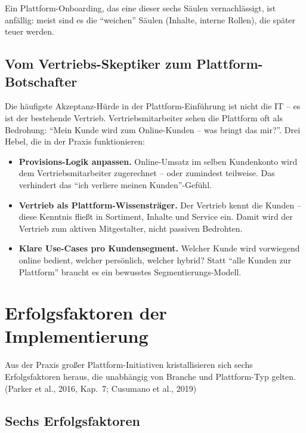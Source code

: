 \documentclass[11pt,a4paper,oneside]{article}
\newcommand{\fachbegriff}[1]{\textbf{#1}}
\newcommand{\quelle}[1]{{\footnotesize\color{lpGray}(#1)}}
\begin{document}
Ein Plattform-Onboarding, das eine dieser sechs Säulen vernachlässigt, ist anfällig: meist sind es die ``weichen'' Säulen (Inhalte, interne Rollen), die später teuer werden.

\subsection{Vom Vertriebs-Skeptiker zum Plattform-Botschafter}

Die häufigste Akzeptanz-Hürde in der Plattform-Einführung ist nicht die IT -- es ist der bestehende Vertrieb. Vertriebsmitarbeiter sehen die Plattform oft als Bedrohung: ``Mein Kunde wird zum Online-Kunden -- was bringt das mir?''. Drei Hebel, die in der Praxis funktionieren:

\begin{itemize}
  \item \fachbegriff{Provisions-Logik anpassen.} Online-Umsatz im selben Kunden­konto wird dem Vertriebsmitarbeiter zugerechnet -- oder zumindest teilweise. Das verhindert das ``ich verliere meinen Kunden''-Gefühl.
  \item \fachbegriff{Vertrieb als Plattform-Wissensträger.} Der Vertrieb kennt die Kunden -- diese Kenntnis fließt in Sortiment, Inhalte und Service ein. Damit wird der Vertrieb zum aktiven Mitgestalter, nicht passiven Bedrohten.
  \item \fachbegriff{Klare Use-Cases pro Kunden­segment.} Welcher Kunde wird vorwiegend online bedient, welcher persönlich, welcher hybrid? Statt ``alle Kunden zur Plattform'' braucht es ein bewusstes Segmentierungs-Modell.
\end{itemize}

\section{Erfolgsfaktoren der Implementierung}

Aus der Praxis großer Plattform-Initiativen kristallisieren sich sechs Erfolgsfaktoren heraus, die unabhängig von Branche und Plattform-Typ gelten. \quelle{Parker et al., 2016, Kap.~7; Cusumano et al., 2019}

\subsection{Sechs Erfolgsfaktoren}
\end{document}
